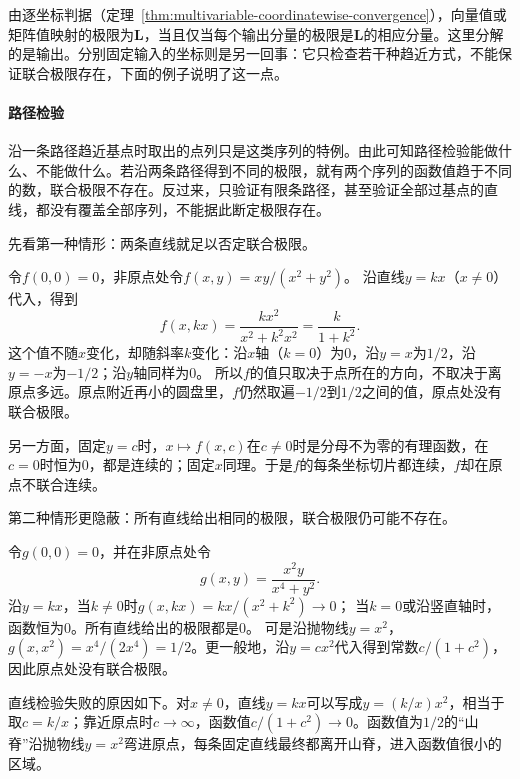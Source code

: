 由逐坐标判据（定理~\ref{thm:multivariable-coordinatewise-convergence}），向量值或矩阵值映射的极限为$\bm L$，当且仅当每个输出分量的极限是$\bm L$的相应分量。这里分解的是输出。分别固定输入的坐标则是另一回事：它只检查若干种趋近方式，不能保证联合极限存在，下面的例子说明了这一点。

\paragraph{路径检验}
沿一条路径趋近基点时取出的点列只是这类序列的特例。由此可知路径检验能做什么、不能做什么。若沿两条路径得到不同的极限，就有两个序列的函数值趋于不同的数，联合极限不存在。反过来，只验证有限条路径，甚至验证全部过基点的直线，都没有覆盖全部序列，不能据此断定极限存在。

先看第一种情形：两条直线就足以否定联合极限。
\begin{example}[沿不同直线得到不同极限]
\label{ex:multivariable-path-limits}
令$f(0,0)=0$，非原点处令$f(x,y)=xy/(x^2+y^2)$。
沿直线$y=kx$（$x\neq0$）代入，得到
\[
 f(x,kx)=\frac{kx^2}{x^2+k^2x^2}=\frac{k}{1+k^2}.
\]
这个值不随$x$变化，却随斜率$k$变化：沿$x$轴（$k=0$）为$0$，沿$y=x$为$1/2$，沿$y=-x$为$-1/2$；沿$y$轴同样为$0$。
所以$f$的值只取决于点所在的方向，不取决于离原点多远。原点附近再小的圆盘里，$f$仍然取遍$-1/2$到$1/2$之间的值，原点处没有联合极限。

另一方面，固定$y=c$时，$x\mapsto f(x,c)$在$c\neq0$时是分母不为零的有理函数，在$c=0$时恒为$0$，都是连续的；固定$x$同理。于是$f$的每条坐标切片都连续，$f$却在原点不联合连续。
\end{example}

第二种情形更隐蔽：所有直线给出相同的极限，联合极限仍可能不存在。
\begin{example}[所有直线极限相同而联合极限不存在]
\label{ex:multivariable-parabola-path-limit}
令$g(0,0)=0$，并在非原点处令
\[
 g(x,y)=\frac{x^2y}{x^4+y^2}.
\]
沿$y=kx$，当$k\neq0$时$g(x,kx)=kx/(x^2+k^2)\to0$；
当$k=0$或沿竖直轴时，函数恒为$0$。所有直线给出的极限都是$0$。
可是沿抛物线$y=x^2$，$g(x,x^2)=x^4/(2x^4)=1/2$。更一般地，沿$y=cx^2$代入得到常数$c/(1+c^2)$，因此原点处没有联合极限。

直线检验失败的原因如下。对$x\neq0$，直线$y=kx$可以写成$y=(k/x)x^2$，相当于取$c=k/x$；靠近原点时$c\to\infty$，函数值$c/(1+c^2)\to0$。函数值为$1/2$的“山脊”沿抛物线$y=x^2$弯进原点，每条固定直线最终都离开山脊，进入函数值很小的区域。
\end{example}


